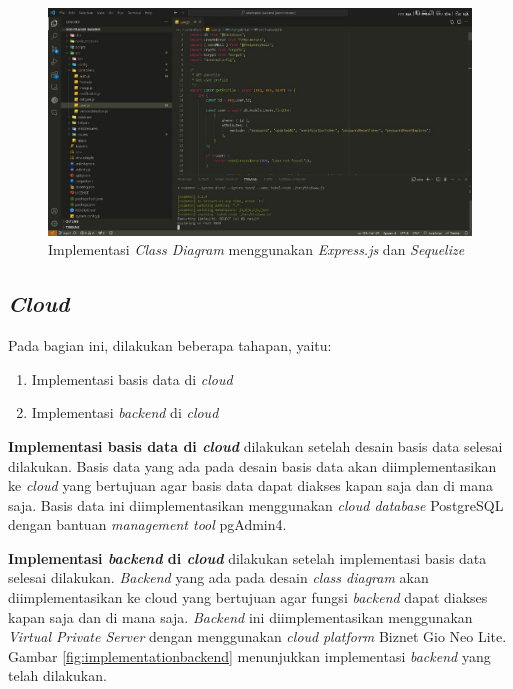 \begin{figure}[htbp]
  \centering

  \includegraphics[scale=0.45]{gambar/bab3-implementasi-class-diagram.jpeg}

  \caption{Implementasi \emph{Class Diagram} menggunakan \emph{Express.js} dan \emph{Sequelize}}
  \label{fig:implementationclassdiagram}
\end{figure}

\subsection{\emph{Cloud}}

Pada bagian ini, dilakukan beberapa tahapan, yaitu:
\begin{enumerate}[nolistsep]
  \item Implementasi basis data di \emph{cloud}
  \item Implementasi \emph{backend} di \emph{cloud}
\end{enumerate}

\textbf{Implementasi basis data di \emph{cloud}} dilakukan setelah desain basis data selesai dilakukan. Basis data yang ada pada desain basis data akan diimplementasikan ke \emph{cloud} yang bertujuan agar basis data dapat diakses kapan saja dan di mana saja. Basis data ini diimplementasikan menggunakan \emph{cloud database} PostgreSQL dengan bantuan \emph{management tool} pgAdmin4.

\textbf{Implementasi \emph{backend} di \emph{cloud}} dilakukan setelah implementasi basis data selesai dilakukan. \emph{Backend} yang ada pada desain \emph{class diagram} akan diimplementasikan ke cloud yang bertujuan agar fungsi \emph{backend} dapat diakses kapan saja dan di mana saja. \emph{Backend} ini diimplementasikan menggunakan \emph{Virtual Private Server} dengan menggunakan \emph{cloud} \emph{platform} Biznet Gio Neo Lite. Gambar \ref{fig:implementationbackend} menunjukkan implementasi \emph{backend} yang telah dilakukan.

